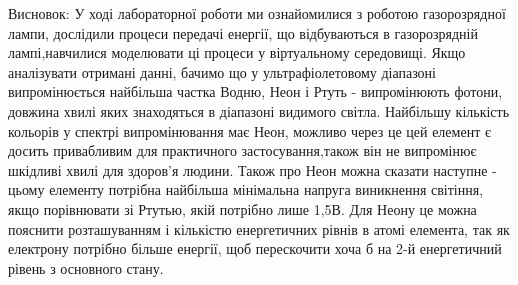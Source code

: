 \documentclass[a4paper,14pt]{extreport}
\begin{document}
\newpage
Висновок: У ході лабораторної роботи ми ознайомилися з роботою газорозрядної лампи, дослідили процеси передачі енергії, що відбуваються в газорозрядній лампі,навчилися моделювати ці процеси у віртуальному середовищі. 
Якщо аналізувати отримані данні, бачимо що у ультрафіолетовому діапазоні випромінюється найбільша частка Водню, Неон і Ртуть - випромінюють фотони, довжина хвилі яких знаходяться в діапазоні видимого світла. Найбільшу кількість кольорів у спектрі випромінювання має Неон, можливо через це цей елемент є досить привабливим для практичного застосування,також він не випромінює шкідливі хвилі для здоров'я людини. Також про Неон можна сказати наступне - цьому елементу потрібна найбільша мінімальна напруга виникнення світіння, якщо порівнювати зі Ртутью, якій потрібно лише 1,5В. Для Неону це можна пояснити розташуванням і кількістю енергетичних рівнів в атомі елемента, так як електрону потрібно більше енергії, щоб перескочити хоча б на  2-й енергетичний рівень з основного стану.
\end{document}
